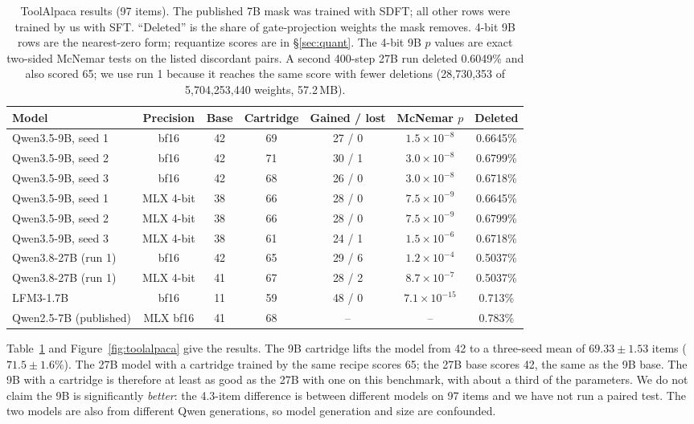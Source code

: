 \documentclass[11pt]{article}
\begin{document}
\begin{table}[t]
\centering
\small
\begin{tabular}{lcccccc}
\toprule
Model & Precision & Base & Cartridge & Gained / lost & McNemar $p$ & Deleted \\
\midrule
Qwen3.5-9B, seed 1 & bf16 & 42 & 69 & 27 / 0 & $1.5\times10^{-8}$ & 0.6645\% \\
Qwen3.5-9B, seed 2 & bf16 & 42 & 71 & 30 / 1 & $3.0\times10^{-8}$ & 0.6799\% \\
Qwen3.5-9B, seed 3 & bf16 & 42 & 68 & 26 / 0 & $3.0\times10^{-8}$ & 0.6718\% \\
Qwen3.5-9B, seed 1 & MLX 4-bit & 38 & 66 & 28 / 0 & $7.5\times10^{-9}$ & 0.6645\% \\
Qwen3.5-9B, seed 2 & MLX 4-bit & 38 & 66 & 28 / 0 & $7.5\times10^{-9}$ & 0.6799\% \\
Qwen3.5-9B, seed 3 & MLX 4-bit & 38 & 61 & 24 / 1 & $1.5\times10^{-6}$ & 0.6718\% \\
Qwen3.8-27B (run 1) & bf16 & 42 & 65 & 29 / 6 & $1.2\times10^{-4}$ & 0.5037\% \\
Qwen3.8-27B (run 1) & MLX 4-bit & 41 & 67 & 28 / 2 & $8.7\times10^{-7}$ & 0.5037\% \\
LFM3-1.7B & bf16 & 11 & 59 & 48 / 0 & $7.1\times10^{-15}$ & 0.713\% \\
Qwen2.5-7B (published) & MLX bf16 & 41 & 68 & -- & -- & 0.783\% \\
\bottomrule
\end{tabular}
\caption{ToolAlpaca results (97 items). The published 7B mask was trained with SDFT; all other rows were trained by us with SFT. ``Deleted'' is the share of gate-projection weights the mask removes. 4-bit 9B rows are the nearest-zero form; requantize scores are in \S\ref{sec:quant}. The 4-bit 9B $p$ values are exact two-sided McNemar tests on the listed discordant pairs. A second 400-step 27B run deleted 0.6049\% and also scored 65; we use run 1 because it reaches the same score with fewer deletions (28,730,353 of 5,704,253,440 weights, 57.2\,MB).}
\label{tab:toolalpaca}
\end{table}

Table~\ref{tab:toolalpaca} and Figure~\ref{fig:toolalpaca} give the results. The 9B cartridge lifts the model from 42 to a three-seed mean of $69.33 \pm 1.53$ items ($71.5 \pm 1.6\%$). The 27B model with a cartridge trained by the same recipe scores 65; the 27B base scores 42, the same as the 9B base. The 9B with a cartridge is therefore at least as good as the 27B with one on this benchmark, with about a third of the parameters. We do not claim the 9B is significantly \emph{better}: the 4.3-item difference is between different models on 97 items and we have not run a paired test. The two models are also from different Qwen generations, so model generation and size are confounded.
\end{document}
